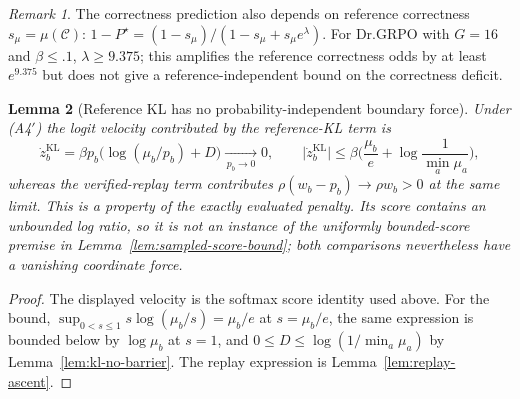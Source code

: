 \documentclass{article}
\newcommand{\enforcehalffinalproseline}{%
  \setlength{\parfillskip}{0pt plus .20\linewidth}}
\newcommand{\1}{\mathbf 1}
\newtheorem{lemma}{Lemma}[section]
\theoremstyle{remark}
\newtheorem{remark}[lemma]{Remark}
\theoremstyle{definition}
\theoremstyle{plain}
\begin{document}
\begin{remark}
The correctness prediction also depends on reference correctness
$s_\mu=\mu(\mathcal C)$:
$1-P^\star=(1-s_\mu)/(1-s_\mu+s_\mu e^\lambda)$.
For Dr.GRPO with $G=16$ and $\beta\le.1$, $\lambda\ge9.375$;
this amplifies the reference correctness odds by at least $e^{9.375}$ but
does not give a reference-independent bound on the correctness deficit.
\end{remark}

\begin{lemma}[Reference KL has no probability-independent boundary force]
\enforcehalffinalproseline
\label{lem:kl-boundary-force}
Under (A4$'$) the logit velocity contributed by the reference-KL term is
\[
  \dot z^{\mathrm{KL}}_b=\beta p_b\big(\log(\mu_b/p_b)+D\big)
  \xrightarrow[\,p_b\to0\,]{}0,
  \qquad
  \big|\dot z^{\mathrm{KL}}_b\big|
  \le\beta\Big(\frac{\mu_b}{e}+\log\frac1{\min_a\mu_a}\Big),
\]
whereas the verified-replay term contributes $\rho(w_b-p_b)\to\rho w_b>0$ at
the same limit. This is a property of the exactly evaluated penalty. Its score contains
an unbounded log ratio, so it is not an instance of the uniformly
bounded-score premise in Lemma~\ref{lem:sampled-score-bound}; both
comparisons nevertheless have a vanishing coordinate force.
\end{lemma}

\begin{proof}
\enforcehalffinalproseline
The displayed velocity is the softmax score identity used above. For the
bound, $\sup_{0<s\le1}s\log(\mu_b/s)=\mu_b/e$ at $s=\mu_b/e$, the same
expression is bounded below by $\log\mu_b$ at $s=1$, and $0\le D\le
\log(1/\min_a\mu_a)$ by Lemma~\ref{lem:kl-no-barrier}. The replay expression is
Lemma~\ref{lem:replay-ascent}.
\end{proof}
\end{document}

